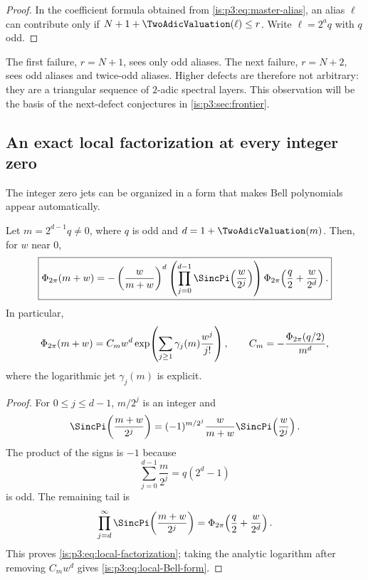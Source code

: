 \begin{proof}
In the coefficient formula obtained from \eqref{is:p3:eq:master-alias}, an alias $\ell$ can contribute only if
$N+1+\TwoAdicValuation(\ell)\le r$.  Write $\ell=2^aq$ with $q$ odd.
\end{proof}

\begin{remark}
The first failure, $r=N+1$, sees only odd aliases.  The next failure, $r=N+2$, sees odd aliases and twice-odd aliases.  Higher defects are therefore not arbitrary: they are a triangular sequence of $2$-adic spectral layers.  This observation will be the basis of the next-defect conjectures in \cref{is:p3:sec:frontier}.
\end{remark}

\subsection{An exact local factorization at every integer zero}

The integer zero jets can be organized in a form that makes Bell polynomials appear automatically.

\begin{proposition}
\label{is:p3:prop:local-factorization}
Let $m=2^{d-1}q\ne0$, where $q$ is odd and $d=1+\TwoAdicValuation(m)$.  Then, for $w$ near $0$,
\begin{equation}
 \boxed{\displaystyle
 \PhiCyc(m+w)
 =-\left(\frac{w}{m+w}\right)^d
 \left(\prod_{j=0}^{d-1}\SincPi\!\left(\frac{w}{2^j}\right)\right)
 \PhiCyc\!\left(\frac q2+\frac{w}{2^d}\right).}
 \label{is:p3:eq:local-factorization}
\end{equation}
In particular,
\begin{equation}
 \Phi_{2\pi}(m+w)=C_mw^d
 \exp\!\left(\sum_{j\ge1}\gamma_j(m)\frac{w^j}{j!}\right),
 \qquad
 C_m=-\frac{\Phi_{2\pi}(q/2)}{m^d},
 \label{is:p3:eq:local-Bell-form}
\end{equation}
where the logarithmic jet $\gamma_j(m)$ is explicit.
\end{proposition}

\begin{proof}
For $0\le j\le d-1$, $m/2^j$ is an integer and
\[
 \SincPi\!\left(\frac{m+w}{2^j}\right)
 =(-1)^{m/2^j}\frac{w}{m+w}
 \SincPi\!\left(\frac{w}{2^j}\right).
\]
The product of the signs is $-1$ because
\[
 \sum_{j=0}^{d-1}\frac m{2^j}=q(2^d-1)
\]
is odd.  The remaining tail is
\[
 \prod_{j=d}^{\infty}\SincPi\!\left(\frac{m+w}{2^j}\right)
 =\PhiCyc\!\left(\frac q2+\frac{w}{2^d}\right).
\]
This proves \eqref{is:p3:eq:local-factorization}; taking the analytic logarithm after removing $C_mw^d$ gives \eqref{is:p3:eq:local-Bell-form}.
\end{proof}

